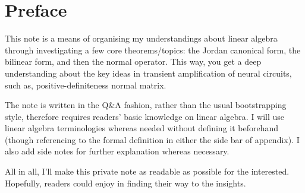 \section*{Preface}

This note is a means of organising my understandings about linear algebra through investigating a few core theorems/topics: the Jordan canonical form, the bilinear form, and then the normal operator. 
This way, you get a deep understanding about the key ideas in transient amplification of neural circuits, such as, positive-definiteness normal matrix.

The note is written in the Q$\&$A fashion, rather than the usual bootstrapping style, therefore requires readers' basic knowledge on linear algebra.
I will use linear algebra terminologies whereas needed without defining it beforehand (though referencing to the formal definition in either the side bar of appendix).
I also add side notes for further explanation whereas necessary. 

All in all, I'll make this private note as readable as possible for the interested. 
Hopefully, readers could enjoy in finding their way to the insights.